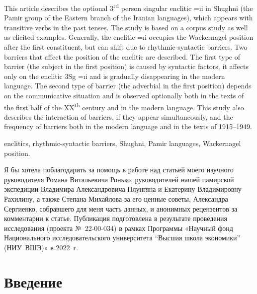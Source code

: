 \begin{eng-abstract}
This article describes the optional 3\textsuperscript{rd} person singular enclitic =\i{i} in Shughni (the Pamir group of the Eastern branch of the Iranian languages), which appears with transitive verbs in the past tenses. The study is based on a corpus study as well as elicited examples. Generally, the enclitic =\i{i} occupies the Wackernagel position after the first constituent, but can shift due to rhythmic-syntactic barriers. Two barriers that affect the position of the enclitic are described. The first type of barrier (the subject in the first position) is caused by syntactic factors, it affects only on the enclitic 3Sg =\i{i} and is gradually disappearing in the modern language. The second type of barrier (the adverbial in the first position) depends on the communicative situation and is observed optionally both in the texts of the first half of the XX\textsuperscript{th} century and in the modern language. This study also describes the interaction of barriers, if they appear simultaneously, and the frequency of barriers both in the modern language and in the texts of 1915–1949.
\end{eng-abstract}

\begin{eng-keywords}
enclitics, rhythmic-syntactic barriers, Shughni, Pamir languages, Wackernagel position.
\end{eng-keywords}

\begin{acknowledgements}
Я бы хотела поблагодарить за помощь в работе над статьей моего научного руководителя Романа Витальевича Ронько, руководителей нашей памирской экспедиции Владимира Александровича Плунгяна и Екатерину Владимировну Рахилину, а также Степана Михайлова за его ценные советы, Александра Сергиенко, собравшего для меня часть данных, и анонимных рецензентов за комментарии к статье. Публикация подготовлена в результате проведения исследования (проекта №~22-00-034) в рамках Программы «Научный фонд Национального исследовательского университета “Высшая школа экономики” (НИУ~ВШЭ)» в 2022~г.
\end{acknowledgements}

\begin{initialprint}
\end{initialprint}

\vfill

\section{Введение} \label{clit-intro}

